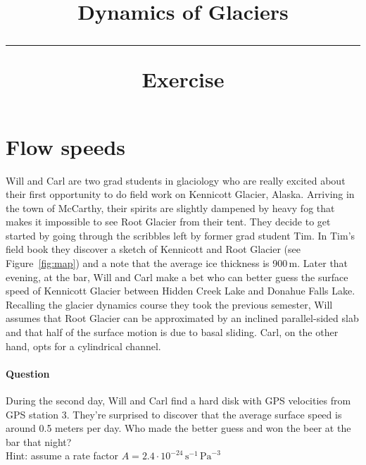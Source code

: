 \documentclass[parskip=half]{scrartcl}
\begin{document}
\vspace{-5em}

\title{Dynamics of Glaciers \\[.2em]
\rule[1em]{\textwidth}{2pt}
\LARGE\textsf{Exercise}
}
\date{}

\vspace{-5em}

\maketitle


\vspace{-5em}

\section{Flow speeds}

Will and Carl are two grad students in glaciology who are really excited about their first opportunity to do field work on Kennicott Glacier, Alaska. Arriving in the town of McCarthy, their spirits are slightly dampened by heavy fog that makes it impossible to see Root Glacier from their tent. They decide to get started by going through the scribbles left by former grad student Tim. In Tim's field book they discover a sketch of Kennicott and Root Glacier (see Figure~\ref{fig:map}) and a note that the average ice thickness is 900\,m. Later that evening, at the bar,  Will and Carl make a bet who can better guess the surface speed of Kennicott Glacier between Hidden Creek Lake and Donahue Falls Lake. Recalling the glacier dynamics course they took the previous semester, Will assumes that Root Glacier can be approximated by an inclined parallel-sided slab and that half of the surface motion is due to basal sliding. Carl, on the other hand, opts for a cylindrical channel. 

\paragraph{Question} During the second day, Will and Carl find a hard disk with GPS velocities from GPS station 3. They're surprised to discover that the average surface speed is around 0.5 meters per day. Who made the better guess and won the beer at the bar that night?
\\[1em]
Hint: assume a rate factor $A=2.4\cdot 10^{-24}\,\textrm{s}^{-1}\,\textrm{Pa}^{-3}$
\end{document}

